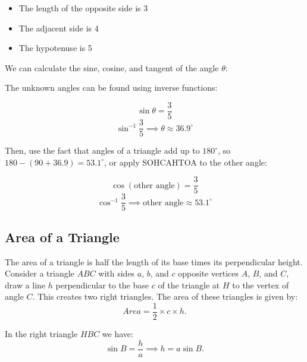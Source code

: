 \documentclass[12pt]{article}
\begin{document}
\begin{itemize}
\item The length of the opposite side is 3
\item The adjacent side is 4
\item The hypotenuse is 5
\end{itemize}

We can calculate the sine, cosine, and tangent of the angle \(\theta\):\\
\begin{center}
\end{center}

The unknown angles can be found using inverse functions:

$$\sin \theta = \frac{3}{5}$$
$$\sin^{-1} \frac{3}{5} \implies \theta \approx36.9^\circ$$

Then, use the fact that angles of a triangle add up to $180^\circ$, so $180-(90+36.9)=53.1^\circ$, or apply SOHCAHTOA to the other angle:

$$\cos (\text{other angle}) = \frac{3}{5}$$
$$\cos^{-1}\frac{3}{5}\implies\text{other angle}\approx53.1^\circ$$

\newpage

\subsection*{Area of a Triangle}
The area of a triangle is half the length of its base times its perpendicular height.\\

Consider a triangle \(ABC\) with sides \(a\), \(b\), and \(c\) opposite vertices \(A\), \(B\), and \(C\), draw a line $h$ perpendicular to the base $c$ of the triangle at $H$ to the vertex of angle $C$. This creates two right triangles. The area of these triangles is given by:
$$Area = \frac{1}{2} \times c \times h.$$

In the right triangle \(HBC\) we have:
$$\sin B = \frac{h}{a} \implies h = a \sin B.$$
\end{document}
